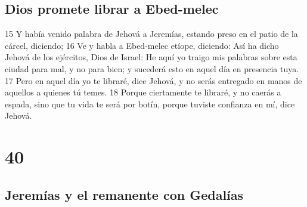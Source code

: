 \section*{Dios promete librar a Ebed-melec}

15 Y había venido palabra de Jehová a Jeremías, estando preso en el patio de la cárcel, diciendo;
16 Ve y habla a Ebed-melec etíope, diciendo: Así ha dicho Jehová de los ejércitos, Dios de Israel: He aquí yo traigo mis palabras sobre esta ciudad para mal, y no para bien; y sucederá esto en aquel día en presencia tuya.
17 Pero en aquel día yo te libraré, dice Jehová, y no serás entregado en manos de aquellos a quienes tú temes.
18 Porque ciertamente te libraré, y no caerás a espada, sino que tu vida te será por botín, porque tuviste confianza en mí, dice Jehová.

\chapter{40}

\section*{Jeremías y el remanente con Gedalías}

